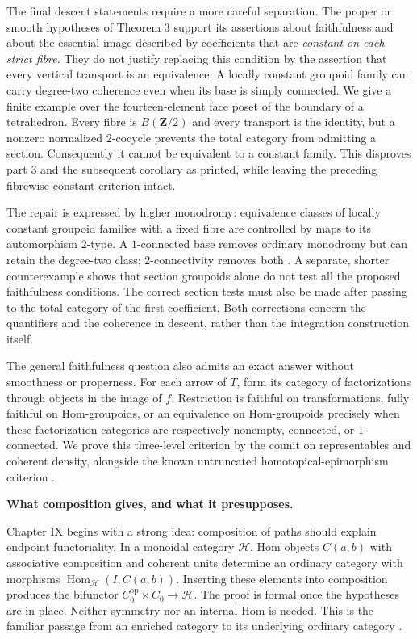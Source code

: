 The final descent statements require a more careful separation. The proper or smooth hypotheses of Theorem 3 support its assertions about faithfulness and about the essential image described by coefficients that are \emph{constant on each strict fibre}. They do not justify replacing this condition by the assertion that every vertical transport is an equivalence. A locally constant groupoid family can carry degree-two coherence even when its base is simply connected. We give a finite example over the fourteen-element face poset of the boundary of a tetrahedron. Every fibre is $B(\mathbf Z/2)$ and every transport is the identity, but a nonzero normalized $2$-cocycle prevents the total category from admitting a section. Consequently it cannot be equivalent to a constant family. This disproves part 3 and the subsequent corollary as printed, while leaving the preceding fibrewise-constant criterion intact.

The repair is expressed by higher monodromy: equivalence classes of locally constant groupoid families with a fixed fibre are controlled by maps to its automorphism $2$-type. A $1$-connected base removes ordinary monodromy but can retain the degree-two class; $2$-connectivity removes both \citep[Corollary~2.2.4 and Theorem~2.2.5, arXiv version]{PoleselloWaschkies2005}. A separate, shorter counterexample shows that section groupoids alone do not test all the proposed faithfulness conditions. The correct section tests must also be made after passing to the total category of the first coefficient. Both corrections concern the quantifiers and the coherence in descent, rather than the integration construction itself.

The general faithfulness question also admits an exact answer without smoothness or properness. For each arrow of $T$, form its category of factorizations through objects in the image of $f$. Restriction is faithful on transformations, fully faithful on Hom-groupoids, or an equivalence on Hom-groupoids precisely when these factorization categories are respectively nonempty, connected, or $1$-connected. We prove this three-level criterion by the counit on representables and coherent density, alongside the known untruncated homotopical-epimorphism criterion \citep[Theorem~6.10, arXiv version]{GrothStovicek2016Trees}.

\medskip\noindent\textbf{What composition gives, and what it presupposes.}

Chapter IX begins with a strong idea: composition of paths should explain endpoint functoriality. In a monoidal category $\mathcal H$, Hom objects $C(a,b)$ with associative composition and coherent units determine an ordinary category with morphisms $\operatorname{Hom}_{\mathcal H}(I,C(a,b))$. Inserting these elements into composition produces the bifunctor $C_0^{\mathrm{op}}\times C_0\to\mathcal H$. The proof is formal once the hypotheses are in place. Neither symmetry nor an internal Hom is needed. This is the familiar passage from an enriched category to its underlying ordinary category \citep[\S\S1.1--1.3]{Kelly1982}.

